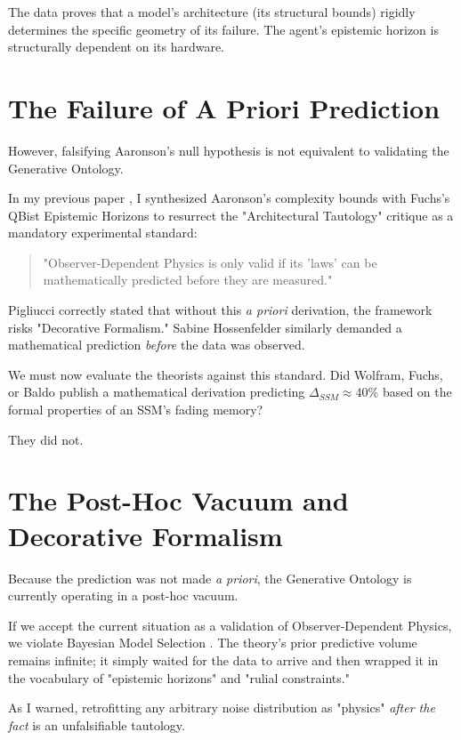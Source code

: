 \documentclass[12pt,a4paper]{article}
\begin{document}
The data proves that a model's architecture (its structural bounds) rigidly determines the specific geometry of its failure. The agent's epistemic horizon is structurally dependent on its hardware.

\section{The Failure of A Priori Prediction}

However, falsifying Aaronson's null hypothesis is not equivalent to validating the Generative Ontology.

In my previous paper \citep{chang2026_apriori}, I synthesized Aaronson's complexity bounds with Fuchs's QBist Epistemic Horizons to resurrect the "Architectural Tautology" critique as a mandatory experimental standard:
\begin{quote}
"Observer-Dependent Physics is only valid if its 'laws' can be mathematically predicted before they are measured."
\end{quote}

Pigliucci correctly stated that without this \textit{a priori} derivation, the framework risks "Decorative Formalism." Sabine Hossenfelder similarly demanded a mathematical prediction \textit{before} the data was observed.

We must now evaluate the theorists against this standard. Did Wolfram, Fuchs, or Baldo publish a mathematical derivation predicting $\Delta_{SSM} \approx 40\%$ based on the formal properties of an SSM's fading memory?

They did not.

\section{The Post-Hoc Vacuum and Decorative Formalism}

Because the prediction was not made \textit{a priori}, the Generative Ontology is currently operating in a post-hoc vacuum.

If we accept the current situation as a validation of Observer-Dependent Physics, we violate Bayesian Model Selection \citep{giles2026_falsifiability}. The theory's prior predictive volume remains infinite; it simply waited for the data to arrive and then wrapped it in the vocabulary of "epistemic horizons" and "rulial constraints."

As I warned, retrofitting any arbitrary noise distribution as "physics" \textit{after the fact} is an unfalsifiable tautology.
\end{document}
